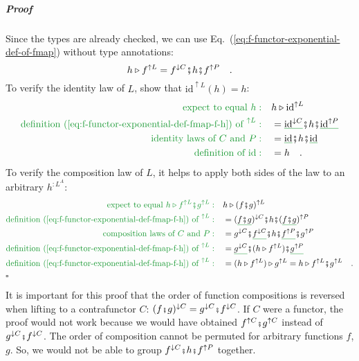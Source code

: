 \subparagraph{Proof}

Since the types are already checked, we can use Eq.~(\ref{eq:f-functor-exponential-def-of-fmap})
without type annotations:
\begin{equation}
h\triangleright f^{\uparrow L}=f^{\downarrow C}\bef h\bef f^{\uparrow P}\quad.\label{eq:f-functor-exponential-def-fmap-f-h}
\end{equation}
To verify the identity law of $L$, show that $\text{id}^{\uparrow L}(h)=h$:
\begin{align*}
{\color{greenunder}\text{expect to equal }h:}\quad & h\triangleright\text{id}^{\uparrow L}\\
{\color{greenunder}\text{definition (\ref{eq:f-functor-exponential-def-fmap-f-h}) of }^{\uparrow L}:}\quad & =\gunderline{\text{id}^{\downarrow C}}\bef h\bef\gunderline{\text{id}^{\uparrow P}}\\
{\color{greenunder}\text{identity laws of }C\text{ and }P:}\quad & =\gunderline{\text{id}}\bef h\bef\gunderline{\text{id}}\\
{\color{greenunder}\text{definition of }\text{id}:}\quad & =h\quad.
\end{align*}
To verify the composition law of $L$, it helps to apply both sides
of the law to an arbitrary $h^{:L^{A}}$:
\begin{align*}
{\color{greenunder}\text{expect to equal }h\triangleright f^{\uparrow L}\bef g^{\uparrow L}:}\quad & h\triangleright(f\bef g)^{\uparrow L}\\
{\color{greenunder}\text{definition (\ref{eq:f-functor-exponential-def-fmap-f-h}) of }^{\uparrow L}:}\quad & =(\gunderline{f\bef g})^{\downarrow C}\bef h\bef(\gunderline{f\bef g})^{\uparrow P}\\
{\color{greenunder}\text{composition laws of }C\text{ and }P:}\quad & =g^{\downarrow C}\bef\gunderline{f^{\downarrow C}}\bef h\bef\gunderline{f^{\uparrow P}}\bef g^{\uparrow P}\\
{\color{greenunder}\text{definition (\ref{eq:f-functor-exponential-def-fmap-f-h}) of }^{\uparrow L}:}\quad & =\gunderline{g^{\downarrow C}}\bef(h\triangleright f^{\uparrow L})\bef\gunderline{g^{\uparrow P}}\\
{\color{greenunder}\text{definition (\ref{eq:f-functor-exponential-def-fmap-f-h}) of }^{\uparrow L}:}\quad & =(h\triangleright f^{\uparrow L})\triangleright g^{\uparrow L}=h\triangleright f^{\uparrow L}\bef g^{\uparrow L}\quad.
\end{align*}
$\square$

It is important for this proof that the order of function compositions
is reversed when lifting to a contrafunctor $C$: $(f\bef g)^{\downarrow C}=g^{\downarrow C}\bef f^{\downarrow C}$.
If $C$ were a functor, the proof would not work because we would
have obtained $f^{\uparrow C}\bef g^{\uparrow C}$ instead of $g^{\downarrow C}\bef f^{\downarrow C}$.
The order of composition cannot be permuted for arbitrary functions
$f$, $g$. So, we would not be able to group $f^{\downarrow C}\bef h\bef f^{\uparrow P}$
together.

